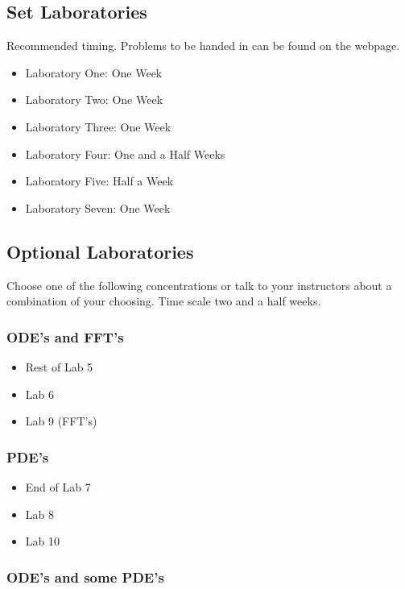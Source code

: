 \documentclass[10pt]{article}
\begin{document}
\subsection*{Set Laboratories}
Recommended timing.  Problems to be handed in can be found on the webpage.

\begin{itemize}
\item Laboratory One: One Week
\item Laboratory Two: One Week
\item Laboratory Three: One Week
\item Laboratory Four: One and a Half Weeks
\item Laboratory Five: Half a Week
\item Laboratory Seven: One Week
\end{itemize}


\subsection*{Optional Laboratories}

Choose one of the following concentrations or talk to your instructors
about a combination of your choosing.  Time scale two and
a half weeks. 

\subsubsection*{ODE's and FFT's}

\begin{itemize}
\item Rest of Lab 5 
\item Lab 6
\item Lab 9 (FFT's)
\end{itemize}

\subsubsection*{PDE's}

\begin{itemize}
\item End of Lab 7
\item Lab 8
\item Lab 10
\end{itemize}

\subsubsection*{ODE's and some PDE's}
\end{document}
